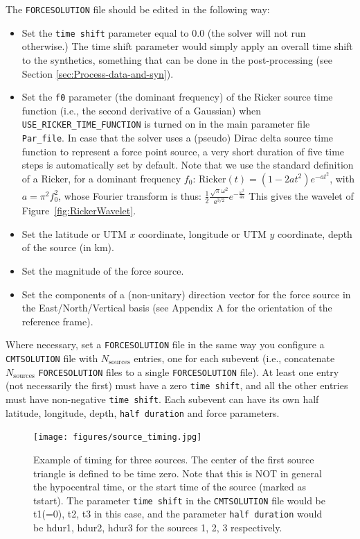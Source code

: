 \noindent The \texttt{FORCESOLUTION} file should be edited in the
following way:
\begin{itemize}
\item Set the \texttt{time shift} parameter equal to $0.0$ (the solver
will not run otherwise.) The time shift parameter would simply apply
an overall time shift to the synthetics, something that can be done
in the post-processing (see Section \ref{sec:Process-data-and-syn}).
\item Set the \texttt{f0} parameter (the dominant frequency) of the Ricker source time
function (i.e., the second derivative of a Gaussian) when {\texttt{USE\_RICKER\_TIME\_FUNCTION}} is turned on
in the main parameter file {\texttt{Par\_file}}. In case that the
solver uses a (pseudo) Dirac delta source time function to represent
a force point source, a very short duration of five time steps is automatically set by default.
Note that we use the standard definition of a Ricker, for a dominant frequency $f_0$:
$\mathrm{Ricker}(t) = (1 - 2 a t^2) e^{-a t^2}$, with $a = \pi^2 f_0^2$,
whose Fourier transform is thus:
$\frac{1}{2} \frac{\sqrt{\pi}\omega^2}{a^{3/2}}e^{-\frac{\omega^2}{4 a}}$
This gives the wavelet of Figure~\ref{fig:RickerWavelet}.
\item Set the latitude or UTM $x$ coordinate, longitude or UTM $y$ coordinate, depth of the source (in km).
\item Set the magnitude of the force source.
\item Set the components of a (non-unitary) direction vector for the force
source in the East/North/Vertical basis (see Appendix A for the orientation
of the reference frame).
\end{itemize}
\noindent Where necessary, set a \texttt{FORCESOLUTION} file in the
same way you configure a \texttt{CMTSOLUTION} file with $N_{\mathrm{sources}}$
entries, one for each subevent (i.e., concatenate $N_{\mathrm{sources}}$
\texttt{FORCESOLUTION} files to a single \texttt{FORCESOLUTION} file).
At least one entry (not necessarily the first) must have a zero \texttt{time
shift}, and all the other entries must have non-negative \texttt{time
shift}. Each subevent can have its own half latitude, longitude, depth,
\texttt{half duration} and force parameters.

\begin{figure}[H]
\begin{centering}
\texttt{[image: figures/source\_timing.jpg]}
\par
\end{centering}
\caption{Example of timing for three sources. The center of the first source
triangle is defined to be time zero. Note that this is NOT in general
the hypocentral time, or the start time of the source (marked as tstart).
The parameter \texttt{time shift} in the \texttt{CMTSOLUTION} file
would be t1(=0), t2, t3 in this case, and the parameter \texttt{half
duration} would be hdur1, hdur2, hdur3 for the sources 1, 2, 3 respectively.}
{\small \label{fig:source_timing} }
\end{figure}

